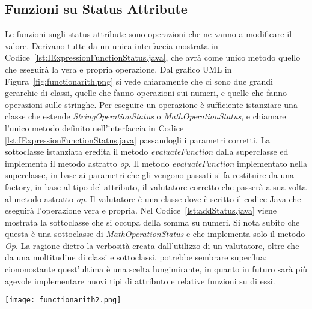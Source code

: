 \subsection{Funzioni su Status Attribute}
\label{sub:funzioni_status_attribute}
Le funzioni sugli status attribute sono operazioni che ne vanno a modificare il valore. Derivano tutte da un unica interfaccia mostrata in Codice~\ref{lst:IExpressionFunctionStatus.java}, che avrà come unico metodo quello che eseguirà la vera e propria operazione.
Dal grafico UML in Figura~\ref{fig:functionarith.png} si vede chiaramente che ci sono due grandi gerarchie di classi, quelle che fanno operazioni sui numeri, e quelle che fanno operazioni sulle stringhe.
Per eseguire un operazione è sufficiente istanziare una classe che estende \textit{StringOperationStatus} o \textit{MathOperationStatus}, e chiamare l'unico metodo definito nell'interfaccia in Codice \ref{lst:IExpressionFunctionStatus.java} passandogli i parametri corretti. La sottoclasse istanziata eredita il metodo \textit{evaluateFunction} dalla superclasse ed implementa il metodo astratto \textit{op}. Il metodo \textit{evaluateFunction} implementato nella superclasse, in base ai parametri che gli vengono passati si fa restituire da una factory, in base al tipo del attributo, il valutatore corretto che passerà a sua volta al metodo astratto \textit{op}. Il valutatore è una classe dove è scritto il codice Java che eseguirà l'operazione vera e propria.
Nel Codice~\ref{lst:addStatus.java} viene mostrata la sottoclasse che si occupa della somma su numeri. Si nota subito che questa è una sottoclasse di \textit{MathOperationStatus} e che implementa solo il metodo \textit{Op}.
La ragione dietro la verbosità creata dall'utilizzo di un valutatore, oltre che da una moltitudine di classi e sottoclassi, potrebbe sembrare superflua; ciononostante quest'ultima è una scelta lungimirante, in quanto in futuro sarà più agevole implementare nuovi tipi di attributo e relative funzioni su di essi.

\begin{sidewaysfigure}
	\texttt{[image: functionarith2.png]}
    \caption{Grafico UML per la gerarchia di funzioni aritmetiche}
    \label{fig:functionarith.png}
\end{sidewaysfigure}


